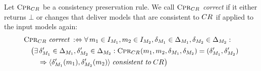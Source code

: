\begin{definition}
    \label{def:consistencypreservationrulecorrectness}
    Let $\textsc{Cpr}_{CR_{}}$ be a consistency preservation rule.
    We call $\textsc{Cpr}_{CR_{}}$ \emph{correct} if it either returns $\bot$ or changes that deliver models that are consistent to $CR_{}$ if applied to the input models again:
    \begin{align*} &
        \consistencypreservationrule{\consistencyrelation{CR}{}} \correctmath \equivalentperdefinition %
        \forall 
        \model{m}{1} \in \metamodelinstanceset{M}{1}, 
        \model{m}{2} \in \metamodelinstanceset{M}{2},
        \change{\metamodel{M}{1}} \in \changeuniverse{\metamodel{M}{1}},
        \change{\metamodel{M}{2}} \in \changeuniverse{\metamodel{M}{2}} : \\
        & \formulaskip
        \bigl( \exists 
        \change{\metamodel{M}{1}}' \in \changeuniverse{\metamodel{M}{1}},
        \change{\metamodel{M}{2}}' \in \changeuniverse{\metamodel{M}{2}} :
        \consistencypreservationrule{\consistencyrelation{CR}{}}(\model{m}{1}, \model{m}{2}, \change{\metamodel{M}{1}}, \change{\metamodel{M}{2}}) = (\change{\metamodel{M}{1}}', \change{\metamodel{M}{2}}') \\
        & \formulaskip\formulaskip
        \Rightarrow
        \tupled{\change{\metamodel{M}{1}}'(\model{m}{1}), \change{\metamodel{M}{2}}'(\model{m}{2})} \consistenttomath \consistencyrelation{CR}{} \bigr)
    \end{align*}
\end{definition}

